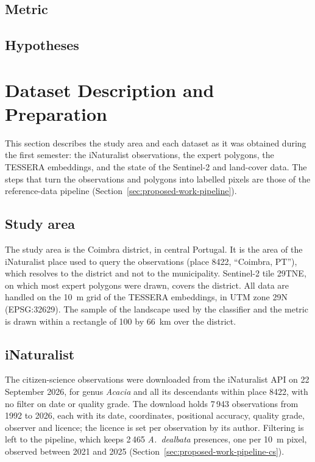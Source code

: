 \subsection{Metric}
\label{sec:proposed-work-design-metric}
\todo[inline]{}

\subsection{Hypotheses}
\label{sec:proposed-work-design-hypotheses}

\section{Dataset Description and Preparation}
\label{sec:proposed-work-data}

This section describes the study area and each dataset as it was
obtained during the first semester: the iNaturalist observations, the
expert polygons, the TESSERA embeddings, and the state of the
Sentinel-2 and land-cover data. The steps that turn the observations
and polygons into labelled pixels are those of the reference-data
pipeline (Section~\ref{sec:proposed-work-pipeline}).

\subsection{Study area}
\label{sec:proposed-work-data-area}

The study area is the Coimbra district, in central Portugal. It is the
area of the iNaturalist place used to query the observations (place
8422, ``Coimbra, PT''), which resolves to the district and not to the
municipality. Sentinel-2 tile 29TNE, on which most expert polygons
were drawn, covers the district. All data are handled on the
10~m grid of the TESSERA embeddings, in UTM zone 29N (EPSG:32629). The
sample of the landscape used by the classifier and the metric is
drawn within a rectangle of 100 by 66~km over the district.

\subsection{iNaturalist}
\label{sec:proposed-work-data-inaturalist}

The citizen-science observations were downloaded from the iNaturalist
API on 22 September 2026, for genus \emph{Acacia} and all its
descendants within place 8422, with no filter on date or quality grade.
The download holds 7\,943 observations from 1992 to 2026, each with
its date, coordinates, positional accuracy, quality grade, observer
and licence; the licence is set per observation by its author.
Filtering is left to the pipeline, which keeps 2\,465
\emph{A.~dealbata} presences, one per 10~m pixel, observed between
2021 and 2025 (Section~\ref{sec:proposed-work-pipeline-cs}).

